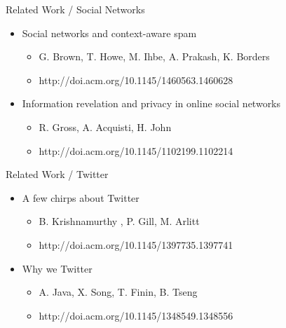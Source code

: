 \documentclass[11pt]{beamer}
\begin{document}
\begin{frame}{Related Work / Social Networks}
  \begin{itemize}
    \item Social networks and context-aware spam
    \begin{itemize}
      \item  G. Brown, T. Howe, M. Ihbe, A. Prakash, K. Borders
      \item http://doi.acm.org/10.1145/1460563.1460628
    \end{itemize}
    \item Information revelation and privacy in online social networks
    \begin{itemize}
      \item R. Gross, A. Acquisti, H.  John
      \item http://doi.acm.org/10.1145/1102199.1102214
    \end{itemize}
  \end{itemize}
\end{frame}

\begin{frame}{Related Work / Twitter}
  \begin{itemize}
    \item A few chirps about Twitter
    \begin{itemize}
      \item B. Krishnamurthy , P. Gill, M. Arlitt
      \item http://doi.acm.org/10.1145/1397735.1397741
    \end{itemize}
    \item Why we Twitter
    \begin{itemize}
      \item A. Java, X. Song, T. Finin, B. Tseng
      \item http://doi.acm.org/10.1145/1348549.1348556
    \end{itemize}
  \end{itemize}
\end{frame}
\end{document}
